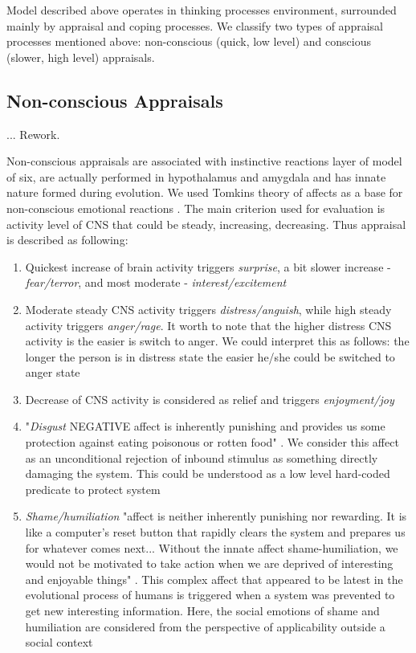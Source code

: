Model described above operates in thinking processes environment, surrounded mainly by appraisal and coping processes. We classify two types of appraisal processes mentioned above: non-conscious (quick, low level) and conscious (slower, high level) appraisals.

\subsection{Non-conscious Appraisals}

... Rework.

Non-conscious appraisals are associated with instinctive reactions layer of model of six, are actually performed in hypothalamus and amygdala and has innate nature formed during evolution. We used Tomkins theory of affects as a base for non-conscious emotional reactions \cite{primer_affect_psychology}. The main criterion used for evaluation is activity level of CNS that could be steady, increasing, decreasing. Thus appraisal is described as following:

\begin{enumerate}
 \item  Quickest increase of brain activity triggers \emph{surprise}, a bit slower increase - \emph{fear/terror}, and most moderate - \emph{interest/excitement}
 \item  Moderate steady CNS activity triggers \emph{distress/anguish}, while high steady activity triggers \emph{anger/rage}. It worth to note that the higher distress CNS activity is the easier is switch to anger. We could interpret this as follows: the longer the person is in distress state the easier he/she could be switched to anger state
 \item  Decrease of CNS activity is considered as relief and triggers \emph{enjoyment/joy}
 \item  "\emph{Disgust} NEGATIVE affect is inherently punishing and provides us some protection against eating poisonous or rotten food" \cite{primer_affect_psychology}. We consider this affect as an unconditional rejection of inbound stimulus as something directly damaging the system. This could be understood as a low level hard-coded predicate to protect system
 \item  \emph{Shame/humiliation} "affect is neither inherently punishing nor rewarding. It is like a computer’s reset button that rapidly clears the system and prepares us for whatever comes next... Without the innate affect shame-humiliation, we would not be motivated to take action when we are deprived of interesting and enjoyable things" \cite{primer_affect_psychology}. This complex affect that appeared to be latest in the evolutional process of humans is triggered when a system was prevented to get new interesting information. Here, the social emotions of shame and humiliation are considered from the perspective of applicability outside a social context
\end{enumerate}

